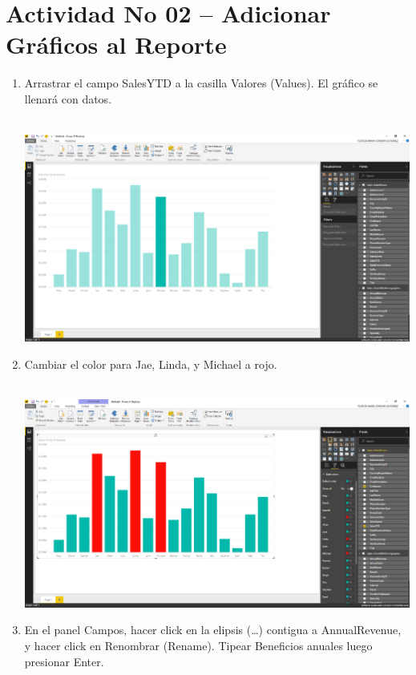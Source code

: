 \section{Actividad No 02 – Adicionar Gráficos al Reporte} 

\begin{enumerate}[1.]
	\item Arrastrar el campo SalesYTD a la casilla Valores (Values). El gráfico se llenará con datos.
	\\
	\\

	\begin{center}
	\includegraphics[width=16cm]{./Imagenes/21} 
	\end{center}

	\item Cambiar el color para Jae, Linda, y Michael a rojo.
	\\
	\\

	\begin{center}
	\includegraphics[width=16cm]{./Imagenes/22} 
	\end{center}

	\item En el panel Campos, hacer click en la elipsis (…) contigua a AnnualRevenue, y hacer click en Renombrar (Rename). Tipear Beneficios anuales luego presionar Enter.
	\\
\\
	

\end{enumerate}
